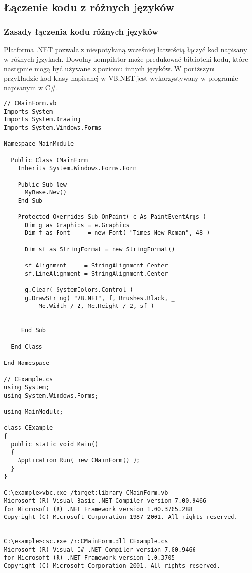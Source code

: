 ﻿\subsection{Łączenie kodu z różnych języków}

\subsubsection{Zasady łączenia kodu różnych języków}

Platforma .NET pozwala z niespotykaną wcześniej łatwością łączyć kod napisany w różnych językach.
Dowolny kompilator może produkować biblioteki kodu, które następnie mogą być używane z poziomu innych języków.
W poniższym przykładzie kod klasy napisanej w VB.NET jest wykorzystywany w programie napisanym w C\#.

\begin{scriptsize}
\begin{verbatim}
// CMainForm.vb
Imports System
Imports System.Drawing
Imports System.Windows.Forms

Namespace MainModule
	
  Public Class CMainForm
    Inherits System.Windows.Forms.Form

    Public Sub New
      MyBase.New()
    End Sub

    Protected Overrides Sub OnPaint( e As PaintEventArgs )
      Dim g as Graphics = e.Graphics
      Dim f as Font     = new Font( "Times New Roman", 48 )

      Dim sf as StringFormat = new StringFormat()

      sf.Alignment     = StringAlignment.Center
      sf.LineAlignment = StringAlignment.Center

      g.Clear( SystemColors.Control )
      g.DrawString( "VB.NET", f, Brushes.Black, _
          Me.Width / 2, Me.Height / 2, sf )


     End Sub
		
  End Class
	
End Namespace

// CExample.cs
using System;
using System.Windows.Forms;

using MainModule;

class CExample 
{
  public static void Main()
  {
    Application.Run( new CMainForm() );
  }  
}

C:\example>vbc.exe /target:library CMainForm.vb
Microsoft (R) Visual Basic .NET Compiler version 7.00.9466
for Microsoft (R) .NET Framework version 1.00.3705.288
Copyright (C) Microsoft Corporation 1987-2001. All rights reserved.


C:\example>csc.exe /r:CMainForm.dll CExample.cs
Microsoft (R) Visual C# .NET Compiler version 7.00.9466
for Microsoft (R) .NET Framework version 1.0.3705
Copyright (C) Microsoft Corporation 2001. All rights reserved.

\end{verbatim}
\end{scriptsize}

